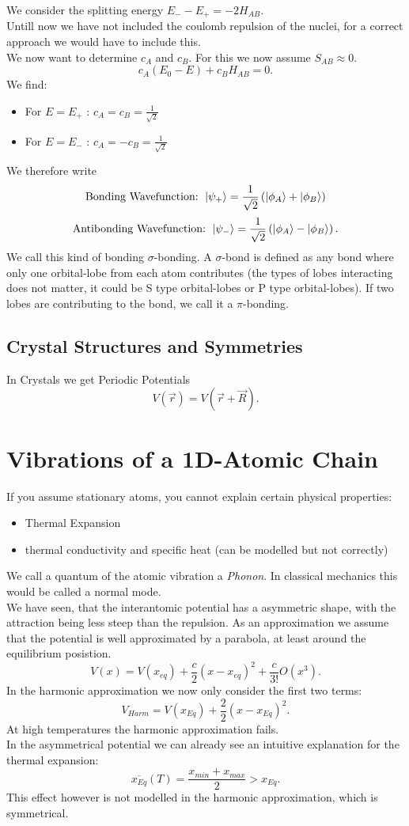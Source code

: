 \documentclass{report}
\begin{document}
We consider the splitting energy $E_- - E_+ = -2H_{AB}$. \\
Untill now we have not included the coulomb repulsion of the nuclei, for a correct approach we would have to include this.\\
We now want to determine $c_A$ and $c_B$. For this we now assume $S_{AB} \approx 0$. \[
	c_A\left( E_0-E \right) +c_BH_{AB} = 0
.\] We find:
\begin{itemize}
	\item For $E = E_+$ : $c_A = c_B = \frac{1}{\sqrt{2} } $ 
	\item For $E = E_-$ : $c_A = -c_B = \frac{1}{\sqrt{2} }$
\end{itemize} We therefore write \[
\text{Bonding Wavefunction: }\ket{\psi_+} = \frac{1}{\sqrt{2} } \left( \ket{\phi_A} + \ket{\phi_B}  \right) 
\] \[
\text{Antibonding Wavefunction: }\ket{\psi_-} = \frac{1}{\sqrt{2} } \left( \ket{\phi_A} - \ket{\phi_B}  \right) 
.\]  
We call this kind of bonding $\sigma$-bonding. A $\sigma$-bond is defined as any bond where only one orbital-lobe from each atom contributes (the types of lobes interacting does not matter, it could be S type orbital-lobes or P type orbital-lobes). If two lobes are contributing to the bond, we call it a $\pi$-bonding.

\section{Crystal Structures and Symmetries}
In Crystals we get Periodic Potentials \[
	V(\vec{r}) = V(\vec{r} + \vec{R})
.\] 
\chapter{Vibrations of a 1D-Atomic Chain}
If you assume stationary atoms, you cannot explain certain physical properties:
\begin{itemize}
	\item Thermal Expansion
	\item thermal conductivity and specific heat (can be modelled but not correctly)
\end{itemize}
We call a quantum of the atomic vibration a \emph{Phonon}. In classical mechanics this would be called a normal mode.\\
We have seen, that the interantomic potential has a asymmetric shape, with the attraction being less steep than the repulsion. As an approximation we assume that the potential is well approximated by a parabola, at least around the equilibrium posistion. \[
	V(x) = V\left( x_{eq} \right) + \frac{c}{2} \left( x -x_{eq} \right)^2 + \frac{c}{3!}O(x^3)
.\] In the harmonic approximation we now only consider the first two terms: \[
V_{Harm} = V\left( x_{Eq} \right) + \frac{2}{2} \left( x - x_{Eq} \right)^2
.\] At high temperatures the harmonic approximation fails.\\
In the asymmetrical potential we can already see an intuitive explanation for the thermal expansion: \[
\overline{x_{Eq}}\left( T \right) = \frac{x_{min} + x_{max}}{2} > x_{Eq}
.\] This effect however is not modelled in the harmonic approximation, which is symmetrical.
\end{document}
